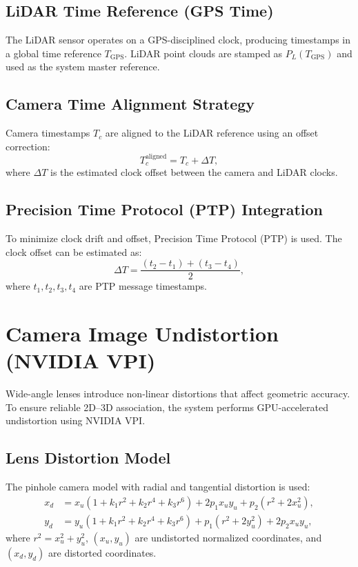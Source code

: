 \documentclass[12pt,a4paper]{report}
\begin{document}
\subsection{LiDAR Time Reference (GPS Time)}
The LiDAR sensor operates on a GPS-disciplined clock, producing timestamps in a global time reference $T_{\mathrm{GPS}}$. LiDAR point clouds are stamped as $P_L(T_{\mathrm{GPS}})$ and used as the system master reference.

\subsection{Camera Time Alignment Strategy}
Camera timestamps $T_c$ are aligned to the LiDAR reference using an offset correction:
\begin{equation}
T_c^{\mathrm{aligned}} = T_c + \Delta T,
\end{equation}
where $\Delta T$ is the estimated clock offset between the camera and LiDAR clocks.

\subsection{Precision Time Protocol (PTP) Integration}
To minimize clock drift and offset, Precision Time Protocol (PTP) is used. The clock offset can be estimated as:
\begin{equation}
\Delta T = \frac{(t_2 - t_1) + (t_3 - t_4)}{2},
\end{equation}
where $t_1,t_2,t_3,t_4$ are PTP message timestamps.

\section{Camera Image Undistortion (NVIDIA VPI)}
Wide-angle lenses introduce non-linear distortions that affect geometric accuracy. To ensure reliable 2D--3D association, the system performs GPU-accelerated undistortion using NVIDIA VPI.

\subsection{Lens Distortion Model}
The pinhole camera model with radial and tangential distortion is used:
\begin{equation}
\begin{aligned}
x_d &= x_u (1 + k_1 r^2 + k_2 r^4 + k_3 r^6) + 2p_1 x_u y_u + p_2(r^2 + 2x_u^2), \\
y_d &= y_u (1 + k_1 r^2 + k_2 r^4 + k_3 r^6) + p_1(r^2 + 2y_u^2) + 2p_2 x_u y_u,
\end{aligned}
\end{equation}
where $r^2 = x_u^2 + y_u^2$, $(x_u,y_u)$ are undistorted normalized coordinates, and $(x_d,y_d)$ are distorted coordinates.
\end{document}
